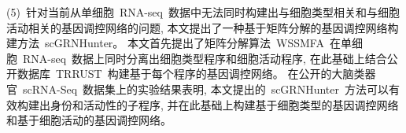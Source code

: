 \begin{abstractcn}
(5)~针对当前从单细胞~RNA-seq~数据中无法同时构建出与细胞类型相关和与细胞活动相关的基因调控网络的问题,
本文提出了一种基于矩阵分解的基因调控网络构建方法~scGRNHunter。
本文首先提出了矩阵分解算法~WSSMFA~在单细胞~RNA-seq~数据上同时分离出细胞类型程序和细胞活动程序,
在此基础上结合公开数据库~TRRUST~构建基于每个程序的基因调控网络。
在公开的大脑类器官~scRNA-Seq~数据集上的实验结果表明,
本文提出的~scGRNHunter~方法可以有效构建出身份和活动性的子程序, 
并在此基础上构建基于细胞类型的基因调控网络和基于细胞活动的基因调控网络。

\end{abstractcn}